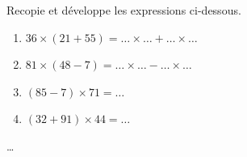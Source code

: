 \begin{exercice*}
    Recopie et développe les expressions ci-dessous.

    \begin{enumerate}
        \item $36 \times (21 + 55) = \dots \times \dots + \dots \times \dots$
        \item $81 \times (48 - 7) = \dots \times \dots - \dots \times \dots$
        \item $(85 - 7) \times 71 = \dots$
        \item $(32 + 91) \times 44 = \dots$
    \end{enumerate}
\end{exercice*}
\begin{corrige}
    \dots
\end{corrige}

